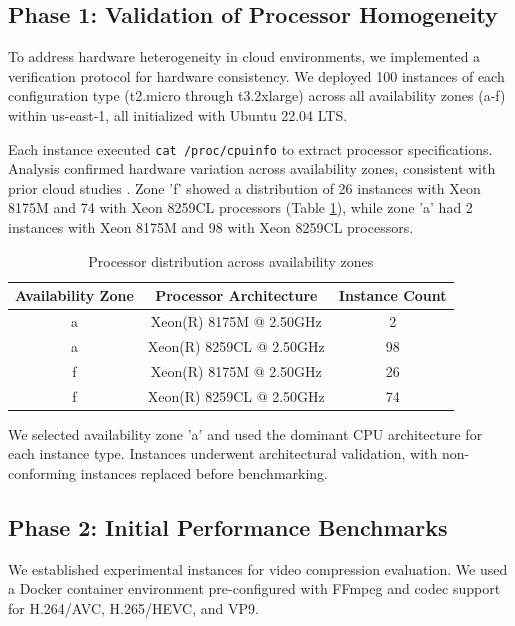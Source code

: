 \documentclass[conference]{IEEEtran}
\begin{document}
	\subsection{Phase 1: Validation of Processor Homogeneity}
	\label{met:validation-processor-homogeneity}
	
	To address hardware heterogeneity in cloud environments, we implemented a verification protocol for hardware consistency. We deployed 100 instances of each configuration type (t2.micro through t3.2xlarge) across all availability zones (a-f) within us-east-1, all initialized with Ubuntu 22.04 LTS.
	
	Each instance executed \texttt{cat /proc/cpuinfo} to extract processor specifications. Analysis confirmed hardware variation across availability zones, consistent with prior cloud studies \cite{b2, b5, b6, b7}. Zone 'f' showed a distribution of 26 instances with Xeon 8175M and 74 with Xeon 8259CL processors (Table \ref{tab:processors}), while zone 'a' had 2 instances with Xeon 8175M and 98 with Xeon 8259CL processors.
	
	\begin{table}[H]
		\centering
		\caption{Processor distribution across availability zones}
		\label{tab:processors}
		\begin{tabular}{|c|c|c|}
			\hline
			Availability Zone & Processor Architecture & Instance Count \\ \hline
			a & Xeon(R) 8175M @ 2.50GHz & 2 \\ \hline
			a & Xeon(R) 8259CL @ 2.50GHz & 98 \\ \hline
			f & Xeon(R) 8175M @ 2.50GHz & 26 \\ \hline
			f & Xeon(R) 8259CL @ 2.50GHz & 74 \\ \hline
		\end{tabular}
	\end{table}
	
	We selected availability zone 'a' and used the dominant CPU architecture for each instance type. Instances underwent architectural validation, with non-conforming instances replaced before benchmarking.
	
	\subsection{Phase 2: Initial Performance Benchmarks}
	\label{execution-initial-performance-benchmarks}
	
	We established experimental instances for video compression evaluation. We used a Docker container environment pre-configured with FFmpeg and codec support for H.264/AVC, H.265/HEVC, and VP9.
	
\end{document}
